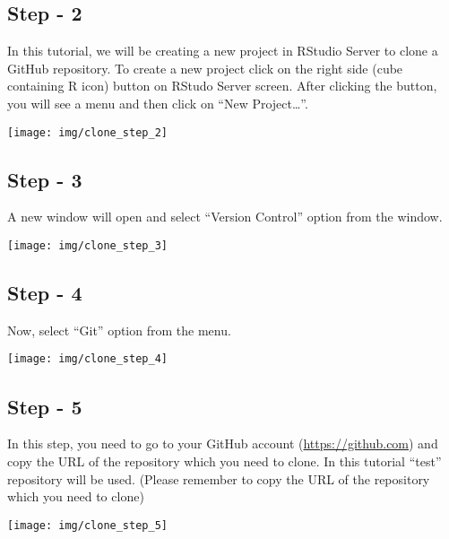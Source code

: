 \documentclass[
]{book}
\begin{document}
\hypertarget{step---2}{%
\subsection{Step - 2}\label{step---2}}

In this tutorial, we will be creating a new project in RStudio Server to clone a GitHub repository. To create a new project click on the right side (cube containing R icon) button on RStudo Server screen. After clicking the button, you will see a menu and then click on ``New Project\ldots{}''.

\begin{center}\texttt{[image: img/clone\_step\_2]} \end{center}

\hypertarget{step---3}{%
\subsection{Step - 3}\label{step---3}}

A new window will open and select ``Version Control'' option from the window.

\begin{center}\texttt{[image: img/clone\_step\_3]} \end{center}

\hypertarget{step---4}{%
\subsection{Step - 4}\label{step---4}}

Now, select ``Git'' option from the menu.

\begin{center}\texttt{[image: img/clone\_step\_4]} \end{center}

\hypertarget{step---5}{%
\subsection{Step - 5}\label{step---5}}

In this step, you need to go to your GitHub account (\url{https://github.com}) and copy the URL of the repository which you need to clone. In this tutorial ``test'' repository will be used. (Please remember to copy the URL of the repository which you need to clone)

\begin{center}\texttt{[image: img/clone\_step\_5]} \end{center}
\end{document}
